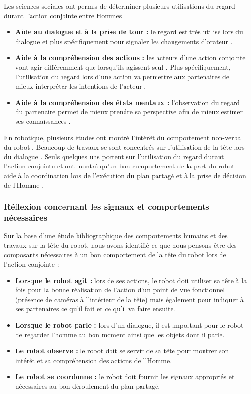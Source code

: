 \documentclass[english,a4paper,11pt,twoside]{StyleThese}
\begin{document}
Les sciences sociales ont permis de déterminer plusieurs utilisations du regard durant l'action conjointe entre Hommes :
\begin{itemize}
\item \textbf{Aide au dialogue et à la prise de tour :} le regard est très utilisé lors du dialogue \cite{argyle1976gaze} et plus spécifiquement pour signaler les changements d'orateur \cite{kendon1967some}. 
\item \textbf{Aide à la compréhension des actions :} les acteurs d'une action conjointe vont agir différemment que lorsqu'ils agissent seul \cite{becchio2010toward, vesper2010minimal}. Plus spécifiquement, l'utilisation du regard lors d'une action va permettre aux partenaires de mieux interpréter les intentions de l'acteur \cite{castiello2003understanding, pierno2006gaze}.
\item \textbf{Aide à la compréhension des états mentaux :} l'observation du regard du partenaire permet de mieux prendre sa perspective afin de mieux estimer ses connaissances \cite{furlanetto2013through}.
\end{itemize}

En robotique, plusieurs études ont montré l’intérêt du comportement non-verbal du robot \cite{furlanetto2013through, haring2012studies}. Beaucoup de travaux se sont concentrés sur l'utilisation de la tête lors du dialogue \cite{mutlu2009footing, boucher2010facilitative, skantze2014turn}. Seuls quelques uns portent sur l'utilisation du regard durant l'action conjointe et ont montré qu'un bon comportement de la part du robot aide à la coordination lors de l'exécution du plan partagé \cite{lallee2013cooperative} et à la prise de décision de l'Homme \cite{boucher2012reach}.

\subsubsection{Réflexion concernant les signaux et comportements nécessaires}

Sur la base d'une étude bibliographique des comportements humains et des travaux sur la tête du robot, nous avons identifié ce que nous pensons être des composants nécessaires à un bon comportement de la tête du robot lors de l'action conjointe :
\begin{itemize}
\item \textbf{Lorsque le robot agit :} lors de ses actions, le robot doit utiliser sa tête à la fois pour la bonne réalisation de l'action d'un point de vue fonctionnel (présence de caméras à l'intérieur de la tête) mais également pour indiquer à ses partenaires ce qu'il fait et ce qu'il va faire ensuite. 
\item \textbf{Lorsque le robot parle :} lors d'un dialogue, il est important pour le robot de regarder l'homme au bon moment ainsi que les objets dont il parle.
\item \textbf{Le robot observe :} le robot doit se servir de sa tête pour montrer son intérêt et sa compréhension des actions de l'Homme.
\item \textbf{Le robot se coordonne :} le robot doit fournir les signaux appropriés et nécessaires au bon déroulement du plan partagé.
\end{itemize}
\end{document}

